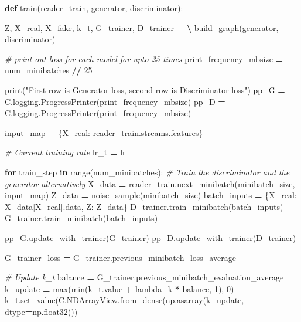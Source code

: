 \documentclass[]{book}
\newenvironment{Shaded}{\begin{snugshade}}{\end{snugshade}}
\newcommand{\KeywordTok}[1]{\textcolor[rgb]{0.13,0.29,0.53}{\textbf{#1}}}
\newcommand{\DecValTok}[1]{\textcolor[rgb]{0.00,0.00,0.81}{#1}}
\newcommand{\StringTok}[1]{\textcolor[rgb]{0.31,0.60,0.02}{#1}}
\newcommand{\CommentTok}[1]{\textcolor[rgb]{0.56,0.35,0.01}{\textit{#1}}}
\newcommand{\ControlFlowTok}[1]{\textcolor[rgb]{0.13,0.29,0.53}{\textbf{#1}}}
\newcommand{\OperatorTok}[1]{\textcolor[rgb]{0.81,0.36,0.00}{\textbf{#1}}}
\newcommand{\BuiltInTok}[1]{#1}
\newcommand{\NormalTok}[1]{#1}
\theoremstyle{definition}
\theoremstyle{definition}
\theoremstyle{definition}
\theoremstyle{remark}
\begin{document}
\begin{Shaded}
\begin{Highlighting}[]
\KeywordTok{def}\NormalTok{ train(reader_train, generator, discriminator):}
        
\NormalTok{    Z, X_real, X_fake, k_t, G_trainer, D_trainer }\OperatorTok{=} \OperatorTok{\textbackslash{}}
\NormalTok{        build_graph(generator, discriminator)}
    
    \CommentTok{# print out loss for each model for upto 25 times}
\NormalTok{    print_frequency_mbsize }\OperatorTok{=}\NormalTok{ num_minibatches }\OperatorTok{//} \DecValTok{25}
    
    \BuiltInTok{print}\NormalTok{(}\StringTok{"First row is Generator loss, second row is Discriminator loss"}\NormalTok{)}
\NormalTok{    pp_G }\OperatorTok{=}\NormalTok{ C.logging.ProgressPrinter(print_frequency_mbsize)}
\NormalTok{    pp_D }\OperatorTok{=}\NormalTok{ C.logging.ProgressPrinter(print_frequency_mbsize)}

\NormalTok{    input_map }\OperatorTok{=}\NormalTok{ \{X_real: reader_train.streams.features\}}
    
    \CommentTok{# Current training rate}
\NormalTok{    lr_t }\OperatorTok{=}\NormalTok{ lr}
                
    \ControlFlowTok{for}\NormalTok{ train_step }\KeywordTok{in} \BuiltInTok{range}\NormalTok{(num_minibatches):}
        \CommentTok{# Train the discriminator and the generator alternatively}
\NormalTok{        X_data }\OperatorTok{=}\NormalTok{ reader_train.next_minibatch(minibatch_size, input_map)}
\NormalTok{        Z_data }\OperatorTok{=}\NormalTok{ noise_sample(minibatch_size)}
\NormalTok{        batch_inputs }\OperatorTok{=}\NormalTok{ \{X_real: X_data[X_real].data, Z: Z_data\}}
\NormalTok{        D_trainer.train_minibatch(batch_inputs)}
\NormalTok{        G_trainer.train_minibatch(batch_inputs)}
        
\NormalTok{        pp_G.update_with_trainer(G_trainer)}
\NormalTok{        pp_D.update_with_trainer(D_trainer)}
        
\NormalTok{        G_trainer_loss }\OperatorTok{=}\NormalTok{ G_trainer.previous_minibatch_loss_average}
        
        \CommentTok{# Update k_t}
\NormalTok{        balance }\OperatorTok{=}\NormalTok{ G_trainer.previous_minibatch_evaluation_average}
\NormalTok{        k_update }\OperatorTok{=} \BuiltInTok{max}\NormalTok{(}\BuiltInTok{min}\NormalTok{(k_t.value }\OperatorTok{+}\NormalTok{ lambda_k }\OperatorTok{*}\NormalTok{ balance, }\DecValTok{1}\NormalTok{), }\DecValTok{0}\NormalTok{)}
\NormalTok{        k_t.set_value(C.NDArrayView.from_dense(np.asarray(k_update, dtype}\OperatorTok{=}\NormalTok{np.float32)))}
        

\end{Highlighting}
\end{Shaded}
\end{document}

